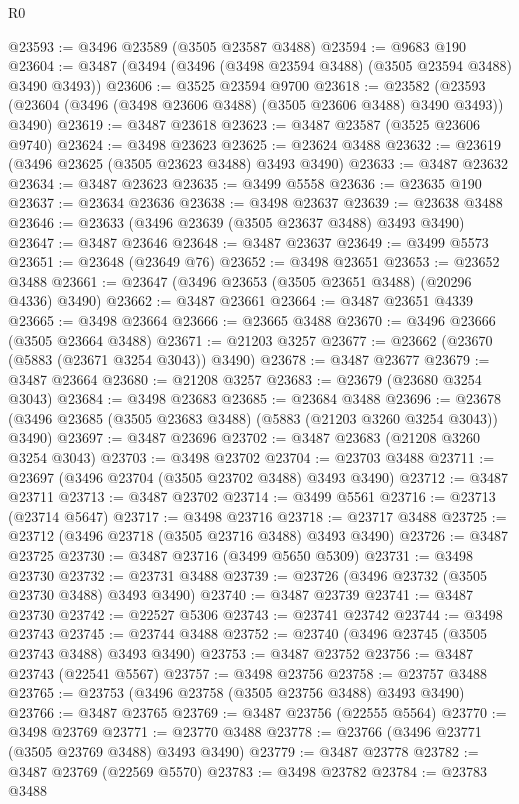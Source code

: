 \begin{lexlean}{R0}
\begin{coremodule}
@23593 := @3496 @23589 (@3505 @23587 @3488)
@23594 := @9683 @190
@23604 := @3487 (@3494 (@3496 (@3498 @23594 @3488) (@3505 @23594 @3488) @3490 @3493))
@23606 := @3525 @23594 @9700
@23618 := @23582
    (@23593 (@23604 (@3496 (@3498 @23606 @3488) (@3505 @23606 @3488) @3490 @3493)) @3490)
@23619 := @3487 @23618
@23623 := @3487 @23587 (@3525 @23606 @9740)
@23624 := @3498 @23623
@23625 := @23624 @3488
@23632 := @23619 (@3496 @23625 (@3505 @23623 @3488) @3493 @3490)
@23633 := @3487 @23632
@23634 := @3487 @23623
@23635 := @3499 @5558
@23636 := @23635 @190
@23637 := @23634 @23636
@23638 := @3498 @23637
@23639 := @23638 @3488
@23646 := @23633 (@3496 @23639 (@3505 @23637 @3488) @3493 @3490)
@23647 := @3487 @23646
@23648 := @3487 @23637
@23649 := @3499 @5573
@23651 := @23648 (@23649 @76)
@23652 := @3498 @23651
@23653 := @23652 @3488
@23661 := @23647 (@3496 @23653 (@3505 @23651 @3488) (@20296 @4336) @3490)
@23662 := @3487 @23661
@23664 := @3487 @23651 @4339
@23665 := @3498 @23664
@23666 := @23665 @3488
@23670 := @3496 @23666 (@3505 @23664 @3488)
@23671 := @21203 @3257
@23677 := @23662 (@23670 (@5883 (@23671 @3254 @3043)) @3490)
@23678 := @3487 @23677
@23679 := @3487 @23664
@23680 := @21208 @3257
@23683 := @23679 (@23680 @3254 @3043)
@23684 := @3498 @23683
@23685 := @23684 @3488
@23696 := @23678 (@3496 @23685 (@3505 @23683 @3488) (@5883 (@21203 @3260 @3254 @3043)) @3490)
@23697 := @3487 @23696
@23702 := @3487 @23683 (@21208 @3260 @3254 @3043)
@23703 := @3498 @23702
@23704 := @23703 @3488
@23711 := @23697 (@3496 @23704 (@3505 @23702 @3488) @3493 @3490)
@23712 := @3487 @23711
@23713 := @3487 @23702
@23714 := @3499 @5561
@23716 := @23713 (@23714 @5647)
@23717 := @3498 @23716
@23718 := @23717 @3488
@23725 := @23712 (@3496 @23718 (@3505 @23716 @3488) @3493 @3490)
@23726 := @3487 @23725
@23730 := @3487 @23716 (@3499 @5650 @5309)
@23731 := @3498 @23730
@23732 := @23731 @3488
@23739 := @23726 (@3496 @23732 (@3505 @23730 @3488) @3493 @3490)
@23740 := @3487 @23739
@23741 := @3487 @23730
@23742 := @22527 @5306
@23743 := @23741 @23742
@23744 := @3498 @23743
@23745 := @23744 @3488
@23752 := @23740 (@3496 @23745 (@3505 @23743 @3488) @3493 @3490)
@23753 := @3487 @23752
@23756 := @3487 @23743 (@22541 @5567)
@23757 := @3498 @23756
@23758 := @23757 @3488
@23765 := @23753 (@3496 @23758 (@3505 @23756 @3488) @3493 @3490)
@23766 := @3487 @23765
@23769 := @3487 @23756 (@22555 @5564)
@23770 := @3498 @23769
@23771 := @23770 @3488
@23778 := @23766 (@3496 @23771 (@3505 @23769 @3488) @3493 @3490)
@23779 := @3487 @23778
@23782 := @3487 @23769 (@22569 @5570)
@23783 := @3498 @23782
@23784 := @23783 @3488

\end{coremodule}
\end{lexlean}
